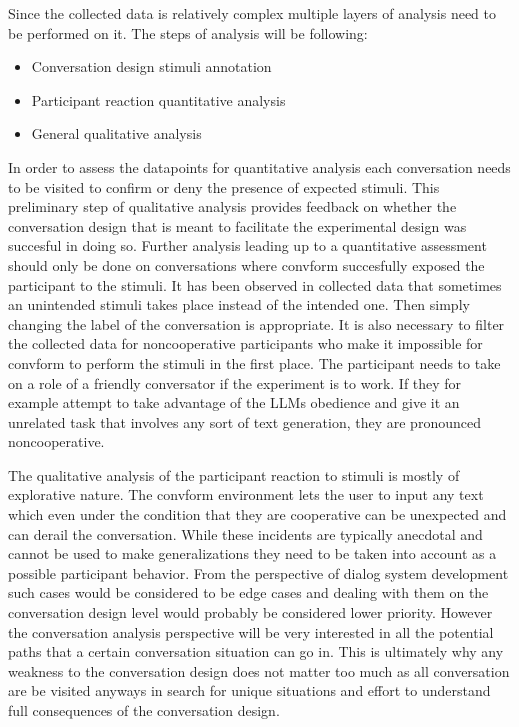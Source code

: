 \documentclass[12pt]{report}
\begin{document}
{Since the collected data is relatively complex
multiple layers of analysis need to be performed on it.
The steps of analysis will be following:

\begin{itemize}
\item{Conversation design stimuli annotation}
\item{Participant reaction quantitative analysis}
\item{General qualitative analysis}
\end{itemize}

In order to assess the datapoints for quantitative analysis
each conversation needs to be visited
to confirm or deny the presence of expected stimuli.
This preliminary step of qualitative analysis
provides feedback on whether the conversation design
that is meant to facilitate the experimental design
was succesful in doing so.
Further analysis leading up to a quantitative assessment
should only be done on conversations
where convform succesfully exposed the participant to the stimuli.
It has been observed in collected data
that sometimes an unintended stimuli
takes place instead of the intended one.
Then simply changing the label of the conversation is appropriate.
It is also necessary to filter the collected data for
noncooperative participants who make it impossible for convform
to perform the stimuli in the first place.
The participant needs to take on a role of a friendly conversator
if the experiment is to work.
If they for example attempt to take advantage of the LLMs obedience
and give it an unrelated task that involves any sort of text generation,
they are pronounced noncooperative.

The qualitative analysis of the participant reaction to stimuli
is mostly of explorative nature.
The convform environment lets the user to input any text
which even under the condition that they are cooperative
can be unexpected and can derail the conversation.
While these incidents are typically anecdotal
and cannot be used to make generalizations
they need to be taken into account
as a possible participant behavior.
From the perspective of dialog system development
such cases would be considered to be edge cases
and dealing with them on the conversation design level
would probably be considered lower priority.
However the conversation analysis perspective
will be very interested in all the potential paths that
a certain conversation situation can go in.
This is ultimately why any weakness to the conversation design
does not matter too much
as all conversation are be visited anyways
in search for unique situations and effort to understand full consequences of the conversation design.

}
\end{document}
